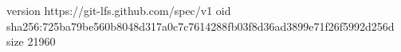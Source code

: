 version https://git-lfs.github.com/spec/v1
oid sha256:725ba79be560b8048d317a0c7c7614288fb03f8d36ad3899e71f26f5992d256d
size 21960
